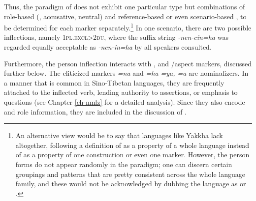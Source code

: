 Thus, the paradigm of  does not exhibit one particular  type but combinations of role-based (, accusative, neutral) and reference-based or even scenario-based , to be determined for each marker separately.\footnote{An alternative view would be to say that languages like Yakkha lack  altogether, following a definition of  as a property of a whole language instead of as a property of one construction or even one marker. However, the person forms do not appear randomly in the paradigm; one can discern certain groupings and patterns that are pretty consistent across the whole language family, and these would not be acknowledged by dubbing the language as  or .} In one scenario, there are two possible inflections, namely {\scshape 1pl.excl>2du}, where the suffix string \emph{-nen-cin=ha} was regarded equally acceptable as \emph{-nen-in=ha} by all speakers consulted. 
 
Furthermore, the person inflection interacts with ,  and /as\-pect markers, discussed further below. The cliticized markers  \emph{=na} and \emph{=ha \ti =ya, \ti =a} are nominalizers. In a manner that is common in Sino-Tibetan languages, they are frequently attached to the inflected verb, lending authority to assertions, or emphasis to questions (see Chapter \ref{ch-nmlz} for a detailed analysis). Since they also encode  and role information, they are included in the discussion of . 

